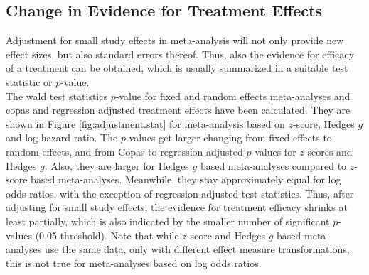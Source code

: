 \documentclass[11pt,a4paper,twoside]{book}\usepackage[]{graphicx}\usepackage[]{color}
\begin{document}
\subsection{Change in Evidence for Treatment Effects}
Adjustment for small study effects in meta-analysis will not only provide new effect sizes, but also standard errors thereof. Thus, also the evidence for efficacy of a treatment can be obtained, which is usually summarized in a suitable test statistic or $p$-value. \\
The wald test statistics $p$-value for fixed and random effects meta-analyses and copas and regression adjusted treatment effects have been calculated. They are shown in Figure \ref{fig:adjustment.stat} for meta-analysis based on $z$-score, Hedges $g$ and log hazard ratio. The $p$-values get larger changing from fixed effects to random effects, and from Copas to regression adjusted $p$-values for $z$-scores and Hedges $g$. Also, they are larger for Hedges $g$ based meta-analyses compared to $z$-score based meta-analyses. Meanwhile, they stay approximately equal for log odds ratios, with the exception of regression adjusted test statistics. Thus, after adjusting for small study effects, the evidence for treatment efficacy shrinks at least partially, which is also indicated by the smaller number of significant $p$-values (0.05 threshold). Note that while $z$-score and Hedges $g$ based meta-analyses use the same data, only with different effect measure transformations, this is not true for meta-analyses based on log odds ratios.\\
\end{document}
